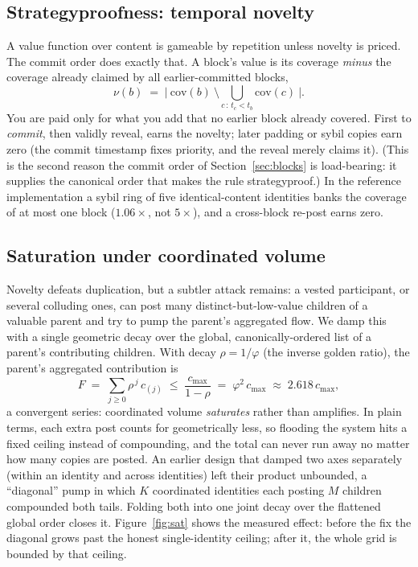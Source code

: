 \documentclass[10pt]{article}
\begin{document}
\subsection{Strategyproofness: temporal novelty}

A value function over content is gameable by repetition unless novelty is priced. The commit order does
exactly that. A block's value is its coverage \emph{minus} the coverage already claimed by all
earlier-committed blocks,
\begin{equation}
\nu(b) \;=\; \Big|\ \mathrm{cov}(b)\ \setminus\!\!\bigcup_{c\,:\,t_c < t_b}\!\! \mathrm{cov}(c)\ \Big|.
\end{equation}
You are paid only for what you add that no earlier block already covered. First to \emph{commit}, then
validly reveal, earns the novelty; later padding or sybil copies earn zero (the commit timestamp fixes
priority, and the reveal merely claims it). (This is the second reason the commit order of
Section~\ref{sec:blocks} is load-bearing: it supplies the canonical order that makes the rule
strategyproof.) In the reference implementation a sybil ring of five identical-content identities banks
the coverage of at most one block ($1.06\times$, not $5\times$), and a cross-block re-post earns zero.

\subsection{Saturation under coordinated volume}

Novelty defeats duplication, but a subtler attack remains: a vested participant, or several colluding
ones, can post many distinct-but-low-value children of a valuable parent and try to pump the parent's
aggregated flow. We damp this with a single geometric decay over the global, canonically-ordered list
of a parent's contributing children. With decay $\rho = 1/\varphi$ (the inverse golden ratio), the
parent's aggregated contribution is
\begin{equation}
F \;=\; \sum_{j\ge 0} \rho^{\,j}\, c_{(j)}
\;\le\; \frac{c_{\max}}{1-\rho} \;=\; \varphi^{2}\,c_{\max} \;\approx\; 2.618\,c_{\max},
\end{equation}
a convergent series: coordinated volume \emph{saturates} rather than amplifies. In plain terms, each
extra post counts for geometrically less, so flooding the system hits a fixed ceiling instead of
compounding, and the total can never run away no matter how many copies are posted. An earlier design that
damped two axes separately (within an identity and across identities) left their product unbounded, a
``diagonal'' pump in which $K$ coordinated identities each posting $M$ children compounded both tails.
Folding both into one joint decay over the flattened global order closes it. Figure~\ref{fig:sat}
shows the measured effect: before the fix the diagonal grows past the honest single-identity ceiling;
after it, the whole grid is bounded by that ceiling.
\end{document}
